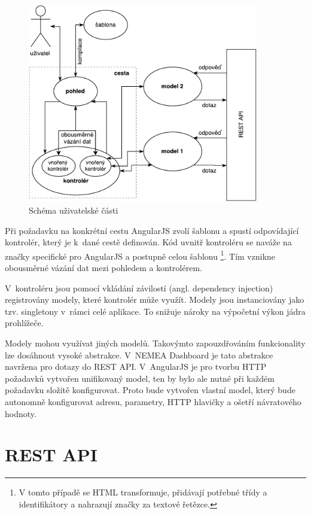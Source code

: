 \begin{figure}[ht]
    \centering
    \includegraphics[width=0.9\textwidth]{fig/frontend.pdf}
    \caption{Schéma uživatelské části} \label{fig:frontend}
\end{figure}

Při požadavku na konkrétní cestu AngularJS zvolí šablonu a spustí odpovídající kontrolér, který je k~dané cestě definován. Kód uvnitř kontroléru se naváže na značky specifické pro AngularJS a postupně celou šablonu \footnote{V tomto případě se HTML transformuje, přidávají potřebné třídy a identifikátory a nahrazují značky za textové řetězce.}. Tím vznikne obousměrné vázání dat mezi pohledem a kontrolérem.

V~kontroléru jsou pomocí vkládání závilostí (angl. dependency injection) registrovány modely, které kontrolér může využít. Modely jsou instanciovány jako tzv. singletony v~rámci celé aplikace. To snižuje nároky na výpočetní výkon jádra prohlížeče.

Modely mohou využívat jiných modelů. Takovýmto zapouzdřováním funkcionality lze dosáhnout vysoké abstrakce. V~NEMEA Dashboard je tato abstrakce navržena pro dotazy do REST API. V~AngularJS je pro tvorbu HTTP požadavků vytvořen unifikovaný model, ten by bylo ale nutné při každém požadavku složitě konfigurovat. Proto bude vytvořen vlastní model, který bude autonomně konfigurovat adresu, parametry, HTTP hlavičky a ošetří návratového hodnoty.

\section{REST API}
\label{restapi}


